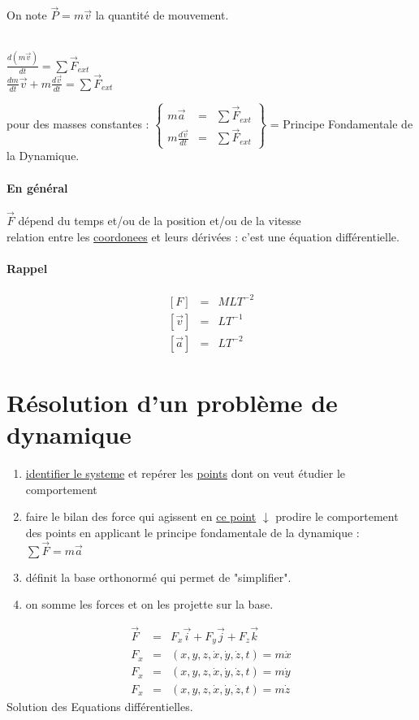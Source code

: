 On note $\vec{P}=m\vec{v}$ la quantité de mouvement.

 ~\\
$\frac{d(m\vec{v})}{dt}=\sum\vec{F}_{ext}$ ~\\
$\frac{dm}{dt}\vec{v}+m\frac{d\vec{v}}{dt}=\sum\vec{F}_{ext}$

pour des masses constantes : $\left\{ \begin{array}{rcl}
		m\vec{a} &=& \sum\vec{F}_{ext} \\
		m\frac{d\vec{v}}{dt}&=&\sum\vec{F}_{ext}
	\end{array}\right\} $ = Principe Fondamentale de la Dynamique.

	\paragraph{En général} $\vec{F}$ dépend du temps et/ou de la position et/ou de la vitesse ~\\
	 relation entre les \ul{coordonees} et leurs dérivées : c'est une équation différentielle.

	\paragraph{Rappel} \[\begin{array}{rcl}
			{[F]} &=& MLT^{-2} \\
			{[\overrightarrow{v}]} &=& LT^{-1} \\
			{[\overrightarrow{a}]} &=& LT^{-2}
	\end{array}\]

	\section{Résolution d'un problème de dynamique}

	\begin{enumerate}
		\item \ul{identifier le systeme} et repérer les \ul{points} dont on veut étudier le comportement
		\item faire le bilan des force qui agissent en \ul{ce point} $\downarrow$ prodire le comportement des points en applicant le principe fondamentale de la dynamique : $\sum\vec{F}=m\vec{a}$
		\item définit la base orthonormé qui permet de "simplifier".
		\item on somme les forces et on les projette sur la base.
	\end{enumerate}

	\[\begin{array}{rcl}
			\vec{F}&=&F_x\vec{i}+F_y\vec{j}+F_z\vec{k} \\
			F_x&=&(x, y, z, \dot{x}, \dot{y}, \dot{z}, t) = m\dot{x} \\
			F_x&=&(x, y, z, \dot{x}, \dot{y}, \dot{z}, t) = m\dot{y} \\
			F_x&=&(x, y, z, \dot{x}, \dot{y}, \dot{z}, t) = m\dot{z}
	\end{array}\]
	Solution des Equations différentielles.
